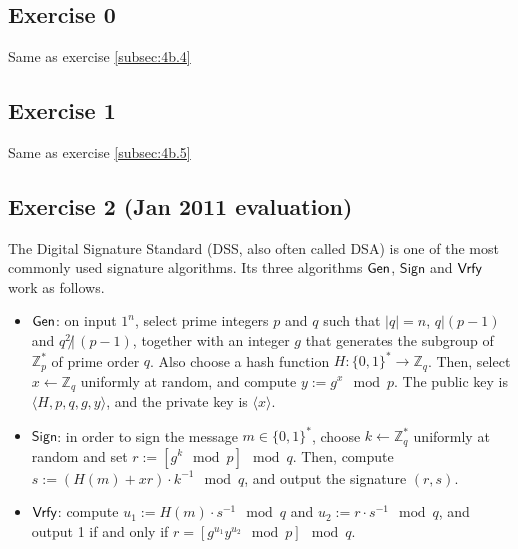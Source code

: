 \section{}
\subsection{Exercise 0}
Same as exercise \ref{subsec:4b.4}

\subsection{Exercise 1}
Same as exercise \ref{subsec:4b.5}

\subsection{Exercise 2 (Jan 2011 evaluation)}
The Digital Signature Standard (DSS, also often called DSA) is one of
the most commonly used signature algorithms. Its three algorithms
$\operatorname{\mathsf{Gen}}$, $\mathsf{Sign}$ and $\operatorname{\mathsf{Vrfy}}$ work as follows.
\begin{itemize}
	\item $\operatorname{\mathsf{Gen}}$: on input $1^n$, select prime integers $p$ and $q$ such
	that $|q|=n$, $q | (p-1)$ and $q^2 \not | \, (p-1)$, together with an
	integer $g$ that generates the subgroup of $\mathbb{Z}_p^*$ of prime
	order $q$. Also choose a hash function $H : \{0,1\}^* \rightarrow
	\mathbb{Z}_q$. Then, select $x \leftarrow \mathbb{Z}_q$ uniformly at
	random, and compute $y:= g^x \mod p$. The public key is $\langle H,
	p, q, g, y\rangle$, and the private key is $\langle x\rangle$.
	\item $\mathsf{Sign}$: in order to sign the message $m \in \{0,1\}^*$, choose
	$k \leftarrow \mathbb{Z}_q^*$ uniformly at random and set $r:= [g^k
	\mod p] \mod q$. Then, compute $s:= (H(m) + xr) \cdot k^{-1} \mod
	q$, and output the signature $(r,s)$.
	\item $\operatorname{\mathsf{Vrfy}}$: compute $u_1 := H(m)\cdot s^{-1} \mod q$ and $u_2 := r
	\cdot s^{-1} \mod q$, and output 1 if and only if $r = [g^{u_1} y^{u_2} \mod p] \mod q$. 
\end{itemize}

